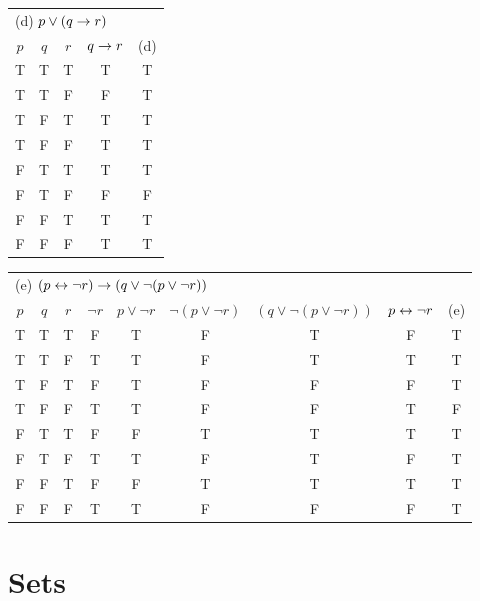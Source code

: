\begin{questions}
\begin{solution}
        \smallskip
        \begin{tabular}{c|c|c||c|c} 
            \multicolumn{5}{l}{(d) $p \vee (q \rightarrow r)$} \\
            $p$ & $q$ & $r$ & $q \rightarrow r$ & (d) \\
         \hline
            T & T & T   & T & T  \\
            T & T & F   & F & T  \\
            T & F & T   & T & T  \\
            T & F & F   & T & T  \\
          \hline
            F & T & T   & T & T  \\
            F & T & F   & F & F  \\
            F & F & T   & T & T  \\
            F & F & F   & T & T 
        \end{tabular} \hspace{0.5in}

        \begin{tabular}{c|c|c|c||c|c|c|c|c}
            \multicolumn{9}{l}{(e) $(p \leftrightarrow \neg r) \rightarrow (q \vee \neg (p \vee \neg r))$ } \\
            $p$ & $q$ & $r$ & $\neg r$ 
             & $p \vee \neg r$ & $\neg (p \vee \neg r)$ 
             & $(q \vee \neg (p \vee \neg r))$ & $p \leftrightarrow \neg r$ & (e) \\
         \hline
            T & T & T & F  & T & F & T  & F & T \\
            T & T & F & T  & T & F & T  & T & T \\
            T & F & T & F  & T & F & F  & F & T \\
            T & F & F & T  & T & F & F  & T & F \\
          \hline
            F & T & T & F  & F & T & T  & T & T \\
            F & T & F & T  & T & F & T  & F & T \\
            F & F & T & F  & F & T & T  & T & T \\
            F & F & F & T  & T & F & F  & F & T
         \end{tabular} 
    \end{solution}



\section*{Sets}


\end{questions}
